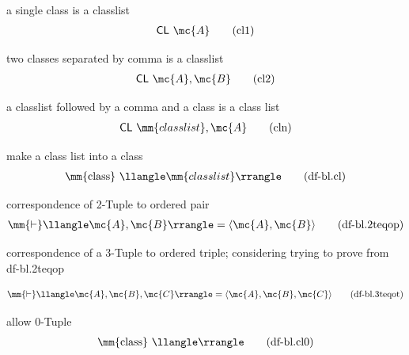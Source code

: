 
\begin{metadefinition} a single class is a classlist
\begin{align}
\mathsf{CL} ~\mc{A}\label{eq:cl1}\tag{cl1}
\end{align}
\end{metadefinition}


\begin{metadefinition} two classes separated by comma is a
classlist
\begin{align}
\mathsf{CL}~\mc{A} , \mc{B}\label{eq:cl2}\tag{cl2}
\end{align}
\end{metadefinition}


\begin{metadefinition} a classlist followed by a comma and a class
is a class list
\begin{align}
\mathsf{CL}~\mm{classlist} , \mc{A}\label{eq:cln}\tag{cln}
\end{align}
\end{metadefinition}


\begin{metadefinition} make a class list into a class
\begin{align}
{\rm \mm{class}~} \llangle \mm{classlist}
    \rrangle\label{eq:df-bl.cl}\tag{df-bl.cl}
\end{align}
\end{metadefinition}

\begin{metadefinition} correspondence of 2-Tuple to
ordered pair
\begin{align}
\mm{\vdash} \llangle \mc{A} , \mc{B} \rrangle = \langle \mc{A} , \mc{B}
    \rangle\label{eq:df-bl.2teqop}\tag{df-bl.2teqop}
\end{align}
\end{metadefinition}

\begin{metadefinition} correspondence of a 3-Tuple to
ordered triple;
considering trying to prove from df-bl.2teqop

\begin{align}
\mm{\vdash} \llangle \mc{A} , \mc{B} , \mc{C} \rrangle = \langle \mc{A} , \mc{B}
    , \mc{C} \rangle\label{eq:df-bl.3teqot}\tag{df-bl.3teqot}
\end{align}
\end{metadefinition}


\begin{metadefinition} allow 0-Tuple
\begin{align}
{\rm \mm{class}~} \llangle \rrangle\label{eq:df-bl.cl0}\tag{df-bl.cl0}
\end{align}
\end{metadefinition}



